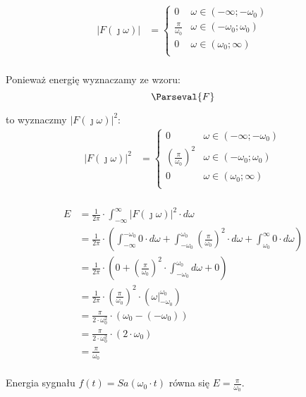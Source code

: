 \begin{task}
\begin{align*}
\left|F(\jmath \omega)\right| &= \begin{cases}
0 & \omega \in \left( -\infty; -\omega_0 \right) \\
\frac{\pi}{\omega_0} & \omega \in \left(-\omega_0; \omega_0 \right) \\
0 & \omega \in \left(\omega_0; \infty \right) \\
\end{cases}\\
\end{align*}

Ponieważ energię wyznaczamy ze wzoru:
\begin{equation}
\Parseval{F}
\end{equation}

to wyznaczmy $\left|F(\jmath \omega)\right|^2$:
\begin{align*}
\left|F(\jmath \omega)\right|^2 &= \begin{cases}
0 & \omega \in \left( -\infty; -\omega_0 \right) \\
\left(\frac{\pi}{\omega_0}\right)^2 & \omega \in \left(-\omega_0; \omega_0 \right) \\
0 & \omega \in \left(\omega_0; \infty \right) \\
\end{cases}\\
\end{align*}

\begin{align*}
E &= \frac{1}{2\pi} \cdot \int_{-\infty}^{\infty} \left|F(\jmath \omega)\right|^2 \cdot d\omega\\
&=\frac{1}{2\pi} \cdot \left(\int_{-\infty}^{-\omega_0} 0 \cdot d\omega + \int_{-\omega_0}^{\omega_0} \left(\frac{\pi}{\omega_0}\right)^2 \cdot d\omega + \int_{\omega_0}^{\infty} 0 \cdot d\omega\right)\\
&=\frac{1}{2\pi} \cdot \left(0 + \left(\frac{\pi}{\omega_0}\right)^2 \cdot \int_{-\omega_0}^{\omega_0} d\omega + 0\right)\\
&=\frac{1}{2\pi} \cdot \left(\frac{\pi}{\omega_0}\right)^2 \cdot \left( \left.\omega \right|_{-\omega_0}^{\omega_0}\right)\\
&=\frac{\pi}{2 \cdot \omega_0^2} \cdot \left(\omega_0 -(-\omega_0)\right)\\
&=\frac{\pi}{2 \cdot \omega_0^2} \cdot \left(2 \cdot \omega_0\right)\\
&=\frac{\pi}{\omega_0}\\
\end{align*}

Energia sygnału $f(t)=Sa\left(\omega_0 \cdot t\right)$ równa się $E=\frac{\pi}{\omega_0}$.

\end{task}

